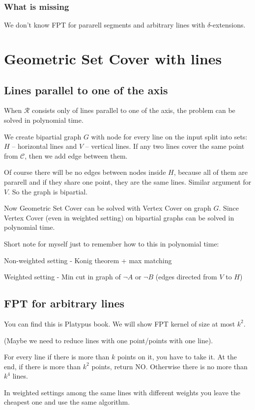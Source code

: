 \documentclass[en]{pracamgr}
\begin{document}
\subsection{What is missing}
We don't know FPT for pararell segments
and arbitrary lines with $\delta$-extensions.

\chapter{Geometric Set Cover with lines}
\section{Lines parallel to one of the axis}
When $\mathcal{R}$ consists only of lines parallel to
one of the axis, the problem can be solved in
polynomial time.

We create bipartial graph $G$ with node for every line on the input
split into sets: $H$ -- horizontal lines and $V$ -- vertical lines.
If any two lines cover the same point from $\mathcal{C}$, then
we add edge between them.

Of course there will be no edges between nodes inside $H$,
because all of them are pararell and if they share 
one point, they are the same lines. Similar argument for $V$.
So the graph is bipartial.

Now Geometric Set Cover can be solved with Vertex Cover on graph $G$.
Since Vertex Cover (even in weighted setting) 
on bipartial graphs can be solved in polynomial time.

Short note for myself just to remember how to this in polynomial time:

Non-weighted setting - Konig theorem + max matching

Weighted setting - Min cut in graph of $\neg A$ or $\neg B$
(edges directed from $V$ to $H$)

\section{FPT for arbitrary lines}
You can find this is Platypus book.
We will show FPT kernel of size at most $k^2$.

(Maybe we need to reduce lines with one point/points with one line).

For every line if there is more than $k$ points on it,
you have to take it. At the end, if there is more than $k^2$ points,
return NO.
Otherwise there is no more than $k^4$ lines.

In weighted settings among the same lines with different weights
you leave the cheapest one and use the same algorithm.
\end{document}
